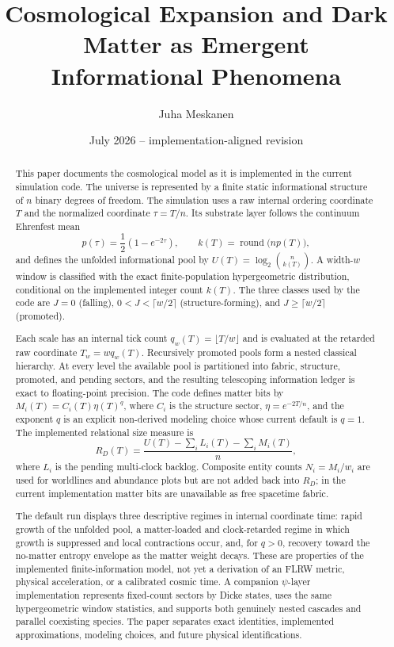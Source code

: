 \documentclass[11pt]{article}
\title{Cosmological Expansion and Dark Matter as Emergent\\
Informational Phenomena}
\author{Juha Meskanen}
\date{July 2026 -- implementation-aligned revision}
\begin{document}
\maketitle

\begin{abstract}
This paper documents the cosmological model as it is implemented in the
current simulation code.  The universe is represented by a finite static
informational structure of $n$ binary degrees of freedom.  The simulation
uses a raw internal ordering coordinate $T$ and the normalized coordinate
$\tau=T/n$.  Its substrate layer follows the continuum Ehrenfest mean
\begin{equation*}
 p(\tau)=\frac12\left(1-e^{-2\tau}\right),
 \qquad
 k(T)=\operatorname{round}\!\bigl(np(T)\bigr),
\end{equation*}
and defines the unfolded informational pool by
$U(T)=\log_2\binom{n}{k(T)}$.  A width-$w$ window is classified with the
exact finite-population hypergeometric distribution, conditional on the
implemented integer count $k(T)$.  The three classes used by the code are
$J=0$ (falling), $0<J<\lceil w/2\rceil$ (structure-forming), and
$J\geq\lceil w/2\rceil$ (promoted).

Each scale has an internal tick count $q_w(T)=\lfloor T/w\rfloor$ and is
evaluated at the retarded raw coordinate $T_w=wq_w(T)$.  Recursively
promoted pools form a nested classical hierarchy.  At every level the
available pool is partitioned into fabric, structure, promoted, and pending
sectors, and the resulting telescoping information ledger is exact to
floating-point precision.  The code defines matter bits by
$M_i(T)=C_i(T)\eta(T)^q$, where $C_i$ is the structure sector,
$\eta=e^{-2T/n}$, and the exponent $q$ is an explicit non-derived modeling
choice whose current default is $q=1$.  The implemented relational size
measure is
\begin{equation*}
 R_D(T)=\frac{U(T)-\sum_i L_i(T)-\sum_i M_i(T)}{n},
\end{equation*}
where $L_i$ is the pending multi-clock backlog.  Composite entity counts
$N_i=M_i/w_i$ are used for worldlines and abundance plots but are not added
back into $R_D$; in the current implementation matter bits are unavailable
as free spacetime fabric.

The default run displays three descriptive regimes in internal coordinate
time: rapid growth of the unfolded pool, a matter-loaded and clock-retarded
regime in which growth is suppressed and local contractions occur, and, for
$q>0$, recovery toward the no-matter entropy envelope as the matter weight
decays.  These are properties of the implemented finite-information model,
not yet a derivation of an FLRW metric, physical acceleration, or a calibrated
cosmic time.  A companion $\psi$-layer implementation represents fixed-count
sectors by Dicke states, uses the same hypergeometric window statistics, and
supports both genuinely nested cascades and parallel coexisting species.
The paper separates exact identities, implemented approximations, modeling
choices, and future physical identifications.
\end{abstract}
\end{document}
